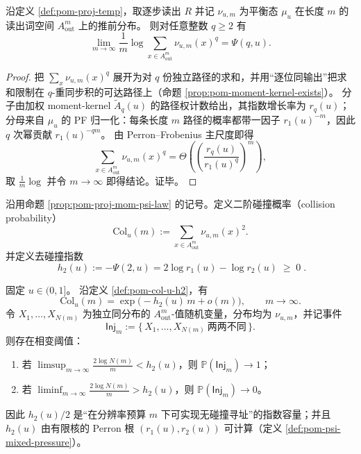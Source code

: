 \begin{proposition}\label{prop:pom-proj-mom-psi-law}
沿定义 \ref{def:pom-proj-temp}，取逐步读出 \(R\) 并记 \(\nu_{u,m}\) 为平衡态 \(\mu_u\) 在长度 \(m\) 的读出词空间 \(A_{\mathrm{out}}^m\) 上的推前分布。
则对任意整数 \(q\ge 2\) 有
\[
\lim_{m\to\infty}\frac{1}{m}\log\sum_{x\in A_{\mathrm{out}}^m}\nu_{u,m}(x)^q
=\Psi(q,u).
\]
\end{proposition}

\begin{proof}
把 \(\sum_x\nu_{u,m}(x)^q\) 展开为对 \(q\) 份独立路径的求和，并用“逐位同输出”把求和限制在 \(q\)-重同步积的可达路径上（命题 \ref{prop:pom-moment-kernel-exists}）。
分子由加权 moment-kernel \(\widetilde A_q(u)\) 的路径权计数给出，其指数增长率为 \(r_q(u)\)；分母来自 \(\mu_u\) 的 PF 归一化：每条长度 \(m\) 路径的概率都带一因子 \(r_1(u)^{-m}\)，因此 \(q\) 次幂贡献 \(r_1(u)^{-qm}\)。
由 Perron--Frobenius 主尺度即得
\[
\sum_{x\in A_{\mathrm{out}}^m}\nu_{u,m}(x)^q=\Theta\!\left(\left(\frac{r_q(u)}{r_1(u)^q}\right)^{\!m}\right),
\]
取 \(\frac1m\log\) 并令 \(m\to\infty\) 即得结论。证毕。
\end{proof}

\begin{definition}[二阶碰撞概率与去碰撞指数]\label{def:pom-col-u-h2}
沿用命题 \ref{prop:pom-proj-mom-psi-law} 的记号。定义二阶碰撞概率（collision probability）
\[
\mathrm{Col}_u(m)
:=
\sum_{x\in A_{\mathrm{out}}^m}\nu_{u,m}(x)^2.
\]
并定义去碰撞指数
\[
\boxed{\;
h_2(u):=-\Psi(2,u)=2\log r_1(u)-\log r_2(u)\;\ge\;0\; }.
\]
\end{definition}

\begin{theorem}\label{thm:pom-collision-threshold-capacity}
固定 \(u\in(0,1]\)。
沿定义 \ref{def:pom-col-u-h2}，有
\[
\mathrm{Col}_u(m)=\exp\!\bigl(-h_2(u)\,m+o(m)\bigr),\qquad m\to\infty.
\]
令 \(X_1,\dots,X_{N(m)}\) 为独立同分布的 \(A_{\mathrm{out}}^m\)-值随机变量，分布均为 \(\nu_{u,m}\)，并记事件
\[
\mathsf{Inj}_m:=\{\,X_1,\dots,X_{N(m)}\ \text{两两不同}\,\}.
\]
则存在相变阈值：
\begin{enumerate}
  \item 若 \(\displaystyle \limsup_{m\to\infty}\frac{2\log N(m)}{m}<h_2(u)\)，则 \(\mathbb{P}(\mathsf{Inj}_m)\to 1\)；
  \item 若 \(\displaystyle \liminf_{m\to\infty}\frac{2\log N(m)}{m}>h_2(u)\)，则 \(\mathbb{P}(\mathsf{Inj}_m)\to 0\)。
\end{enumerate}
因此 \(h_2(u)/2\) 是“在分辨率预算 \(m\) 下可实现无碰撞寻址”的指数容量；并且 \(h_2(u)\) 由有限核的 Perron 根 \((r_1(u),r_2(u))\) 可计算（定义 \ref{def:pom-psi-mixed-pressure}）。
\end{theorem}


